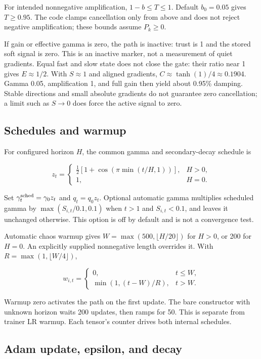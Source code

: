 \documentclass[11pt,a4paper]{article}
\begin{document}
For intended nonnegative amplification, $1-b\leq T\leq1$. Default $b_0=0.05$ gives $T\geq0.95$. The code clamps cancellation only from above and does not reject negative amplification; these bounds assume $P_k\geq0$.

If gain or effective gamma is zero, the path is inactive: trust is 1 and the stored soft signal is zero. This is an inactive marker, not a measurement of quiet gradients. Equal fast and slow state does not close the gate: their ratio near 1 gives $E\approx1/2$. With $S\approx1$ and aligned gradients, $C\approx\tanh(1)/4\approx0.1904$. Gamma 0.05, amplification 1, and full gain then yield about 0.95\% damping. Stable directions and small absolute gradients do not guarantee zero cancellation; a limit such as $S\to0$ does force the active signal to zero.

\subsection{Schedules and warmup}

For configured horizon $H$, the common gamma and secondary-decay schedule is

\[
z_t=\begin{cases}\tfrac12[1+\cos(\pi\min(t/H,1))],&H>0,\\1,&H=0.\end{cases}
\]

Set $\gamma_t^{\rm sched}=\gamma_0z_t$ and $q_t=q_0z_t$. Optional automatic gamma multiplies scheduled gamma by $\max(S_{i,t}/0.1,0.1)$ when $t>1$ and $S_{i,t}<0.1$, and leaves it unchanged otherwise. This option is off by default and is not a convergence test.

Automatic chaos warmup gives $W=\max(500,\lfloor H/20\rfloor)$ for $H>0$, or 200 for $H=0$. An explicitly supplied nonnegative length overrides it. With $R=\max(1,\lfloor W/4\rfloor)$,

\[
w_{i,t}=\begin{cases}0,&t\leq W,\\\min(1,(t-W)/R),&t>W.\end{cases}
\]

Warmup zero activates the path on the first update. The bare constructor with unknown horizon waits 200 updates, then ramps for 50. This is separate from trainer LR warmup. Each tensor's counter drives both internal schedules.

\subsection{Adam update, epsilon, and decay}
\end{document}
